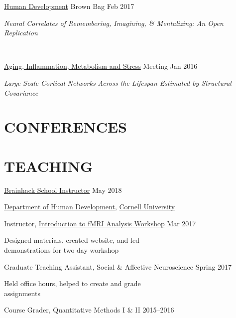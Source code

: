 \documentclass{dupre-cv}
\begin{document}
\href{http://www.human.cornell.edu/hd/}{Human Development} Brown Bag \hfill Feb 2017 \\[0.15cm]
\begin{minipage}{10cm}
\textit{Neural Correlates of Remembering, Imagining, \& Mentalizing: An Open Replication}
\end{minipage} \\
\vspace{10pt}

\href{https://www.libert.cornell.edu/index.php/amm2}{Aging, Inflammation, Metabolism and Stress} Meeting \hfill Jan 2016 \\[0.15cm]
\begin{minipage}{10cm}
\textit{Large Scale Cortical Networks Across the Lifespan      Estimated by Structural Covariance}
\end{minipage}
\vspace{15pt}

\section{CONFERENCES}


\section{TEACHING}

\href{https://brainhackmtl.github.io/school2018/}{Brainhack School Instructor} \hfill May 2018
\vspace{12pt}

\href{http://www.human.cornell.edu/hd/}{Department of Human Development}, \href{https://www.cornell.edu/}{Cornell University}
\begin{outerlist}
 \item[Instructor, \href{https://emdupre.github.io/hd4630_workshops/categories}{Introduction to fMRI Analysis Workshop}] \hfill Mar 2017
  \begin{innerlist}
  \item Designed materials, created website, and led \\  demonstrations for two day workshop
 \end{innerlist}
 
 \item[Graduate Teaching Assistant, Social \& Affective Neuroscience] \hfill Spring 2017
 \begin{innerlist}
  \item Held office hours, helped to create and grade \\ assignments
 \end{innerlist}
 
 \item[Course Grader, Quantitative Methods I \& II] \hfill 2015--2016
\end{outerlist}
\end{document}
